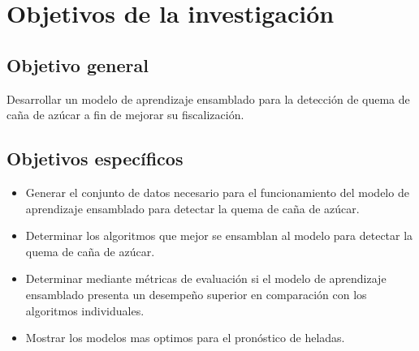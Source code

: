 \section{Objetivos de la investigación}
\subsection{Objetivo general}
Desarrollar un modelo de aprendizaje ensamblado para la detección de quema de caña de azúcar a fin de mejorar su fiscalización.
\subsection{Objetivos específicos}
\begin{itemize}
    \item Generar el conjunto de datos necesario para el funcionamiento del modelo de aprendizaje ensamblado para detectar la quema de caña de azúcar.
    \item Determinar los algoritmos que mejor se ensamblan al modelo para detectar la quema de caña de azúcar.
    \item Determinar mediante métricas de evaluación si el modelo de aprendizaje ensamblado presenta un desempeño superior en comparación con los algoritmos individuales.
    \item Mostrar los modelos mas optimos para el pronóstico de heladas.
\end{itemize}
